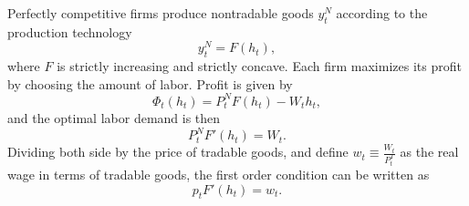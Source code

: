 Perfectly competitive firms produce nontradable goods $y^N_t$ according to the production technology
\begin{equation}
    y^N_t = F(h_t),
\end{equation}
where $F$ is strictly increasing and strictly concave. Each firm maximizes its profit by choosing the amount of labor. Profit is given by
\begin{equation}
    \Phi_t(h_t) = P^N_t F(h_t) - W_t h_t,
\end{equation}
and the optimal labor demand is then
\begin{equation*}
    P^N_t F'(h_t) = W_t.
\end{equation*}
Dividing both side by the price of tradable goods, and define $w_t \equiv \frac{W_t}{P^T_t}$ as the real wage in terms of tradable goods, the first order condition can be written as
\begin{equation}
    \label{eq:firm-FOC}
    p_t F'(h_t) = w_t.
\end{equation}
